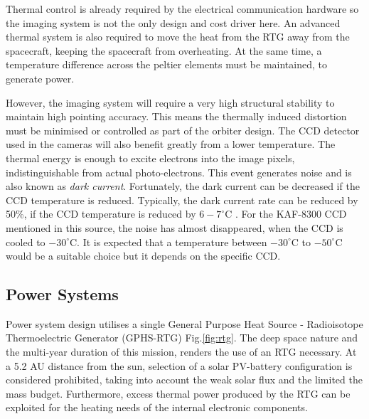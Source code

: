 Thermal control is already required by the electrical communication hardware so the imaging system is not the only design and cost driver here. An advanced thermal system is also required to move the heat from the RTG away from the spacecraft, keeping the spacecraft from overheating. At the same time, a temperature difference across the peltier elements must be maintained, to generate power. 

However, the imaging system will require a very high structural stability to maintain high pointing accuracy. This means the thermally induced distortion must be minimised or controlled as part of the orbiter design. The CCD detector used in the cameras will also benefit greatly from a lower temperature. The thermal energy is enough to excite electrons into the image pixels, indistinguishable from actual photo-electrons. This event generates noise and is also known as \textit{dark current}. Fortunately, the dark current can be decreased if the CCD temperature is reduced. Typically, the dark current rate can be reduced by 50\%, if the CCD temperature is reduced by $6-7^\circ$C \cite{sbig2014}. For the KAF-8300 CCD mentioned in this source, the noise has almost disappeared, when the CCD is cooled to $-30^\circ$C. It is expected that a temperature between $-30^\circ$C to $-50^\circ$C would be a suitable choice but it depends on the specific CCD.
\newpage
\subsection{Power Systems}

Power system design utilises a single General Purpose Heat Source - Radioisotope Thermoelectric Generator (GPHS-RTG) Fig.\ref{fig:rtg}. The deep space nature and the multi-year duration of this mission, renders the use of an RTG necessary. At a 5.2 AU distance from the sun, selection of a solar PV-battery configuration is considered prohibited, taking into account the weak solar flux and the limited the mass budget. Furthermore, excess thermal power produced by the RTG can be exploited for the heating needs of the internal electronic components.


